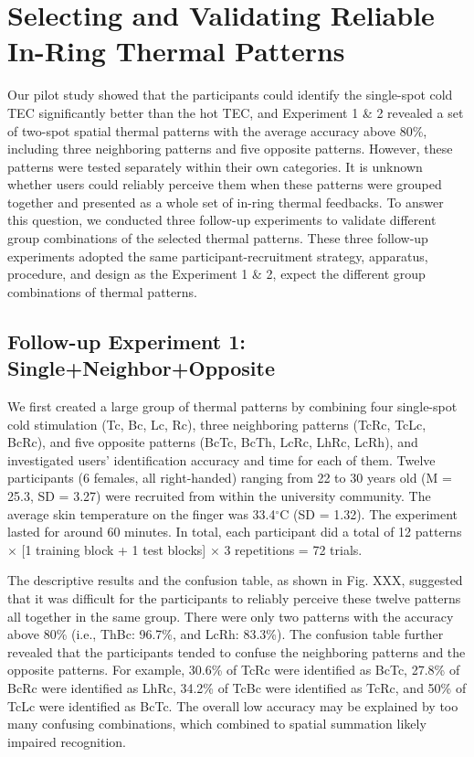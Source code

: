 \documentclass[preprint,12pt]{elsarticle}
\begin{document}
\section{Selecting and Validating Reliable In-Ring Thermal Patterns}
Our pilot study showed that the participants could identify the single-spot cold TEC significantly better than the hot TEC, and Experiment 1 \& 2 revealed a set of two-spot spatial thermal patterns with the average accuracy above 80\%, including three neighboring patterns and five opposite patterns. However, these patterns were tested separately within their own categories. It is unknown whether users could reliably perceive them when these patterns were grouped together and presented as a whole set of in-ring thermal feedbacks. To answer this question, we conducted three follow-up experiments to validate different group combinations of the selected thermal patterns. These three follow-up experiments adopted the same participant-recruitment strategy, apparatus, procedure, and design as the Experiment 1 \& 2, expect the different group combinations of thermal patterns.

\subsection{Follow-up Experiment 1: Single+Neighbor+Opposite}
We first created a large group of thermal patterns by combining four single-spot cold stimulation (Tc, Bc, Lc, Rc), three neighboring patterns (TcRc, TcLc, BcRc), and five opposite patterns (BcTc, BcTh, LcRc, LhRc, LcRh), and investigated users' identification accuracy and time for each of them. Twelve participants (6 females, all right-handed) ranging from 22 to 30 years old (M = 25.3, SD = 3.27) were recruited from within the university community. The average skin temperature on the finger was 33.4$^{\circ}$C (SD = 1.32). The experiment lasted for around 60 minutes. In total, each participant did a total of 12 patterns $\times$ [1 training block + 1 test blocks] $\times$ 3 repetitions = 72 trials.

The descriptive results and the confusion table, as shown in Fig. XXX, suggested that it was difficult for the participants to reliably perceive these twelve patterns all together in the same group. There were only two patterns with the accuracy above 80\% (i.e., ThBc: 96.7\%, and LcRh: 83.3\%). The confusion table further revealed that the participants tended to confuse the neighboring patterns and the opposite patterns. For example, 30.6\% of TcRc were identified as BcTc, 27.8\% of BcRc were identified as LhRc, 34.2\% of TcBc were identified as TcRc, and 50\% of TcLc were identified as BcTc.
The overall low accuracy may be explained by too many confusing combinations, which combined to spatial summation likely impaired recognition.
\end{document}

